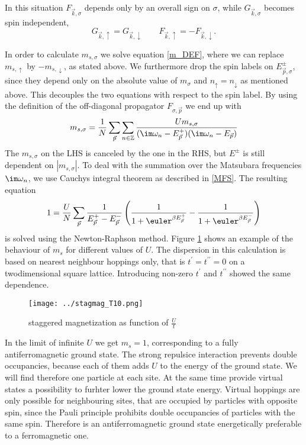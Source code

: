 \documentclass[a4paper,10pt]{report}
\begin{document}
In this situation $F_{\vec k,\sigma}$ depends only by an overall sign on $\sigma$, while $G_{\vec k,\sigma}$ becomes spin independent,
\begin{equation}
 G_{\vec k,\uparrow} = G_{\vec k,\downarrow} \qquad F_{\vec k,\uparrow} =-F_{\vec k,\downarrow}.
\end{equation}




In order to calculate $m_ {s,\sigma}$ we solve equation \ref{m_DEF}, where we can replace $m_{s,\uparrow}$ by $-m_{s,\downarrow}$, as stated above.
We furthermore drop the spin labels on $E_{\vec p,\sigma}^{\pm}$, 
since they depend only on the absolute value of $m_{\sigma}$ and $n_{\uparrow} = n_{\downarrow}$ as mentioned above.
This decouples the two equations with respect to the spin label.
By using the definition of the off-diagonal propagator $F_{\sigma,\vec{p}}$ we end up with
\begin{equation}
 m_{s,\sigma} = \frac1N \sum_{\vec{p}} \sum_{n\in \mathbb{Z}} 
							      \frac { Um_{s,\sigma} }
								    { (\im \omega_n - E_{\vec{p}}^+) (\im \omega_n - E_{\vec{p}})}
\end{equation}
The $m_{s,\sigma}$ on the LHS is canceled by the one in the RHS, but $E^{\pm}$ is still dependent on $|m_{s,\sigma}|$.
To deal with the summation over the Matsubara frequencies $\im \omega_n$, we use Cauchys integral theorem as described in \ref{MFS}.
The resulting equation
\begin{equation}
 1= \frac{U}{N}\sum_{\vec{p}} \frac{1}{E_{\vec p}^+ - E_{\vec{p}}^-} \left( \frac{1}{1+\euler^{\beta E_{\vec p}^+}} - \frac{1}{1+\euler^{\beta E_{\vec p}^-}} \right)
\end{equation}
is solved using the Newton-Raphson method.
Figure \ref{ms_nn} shows an example of the behaviour of $m_s$ for different values of $U$. The dispersion in this calculation is based 
on nearest neighbour hoppings only, that is $t^{\prime} = t^{\prime \prime} = 0$ on a twodimensional square lattice.
Introducing non-zero $t^{\prime}$ and $t^{\prime \prime}$ showed the same dependence. 
%
%
\begin{figure}
 \label{ms_nn}
 \texttt{[image: ../stagmag\_T10.png]}
 \caption{staggered magnetization as function of $\frac Ut$}
 
\end{figure}
%
In the limit of infinite $U$ we get $m_s=1$, corresponding to a fully antiferromagnetic ground state. 
The strong repulsice interaction prevents double occupancies, because each of them adds $U$ to the energy of the ground state.
We will find therefore one particle at each site.
At the same time provide virtual states a possibility to furhter lower the ground state energy.
Virtual hoppings are only possible for neighbouring sites, that are occupied by particles with opposite spin,
since the Pauli principle prohibits double occupancies of particles with the same spin.
Therefore is an antiferromagnetic ground state energetically preferable to a ferromagnetic one.
\end{document}
